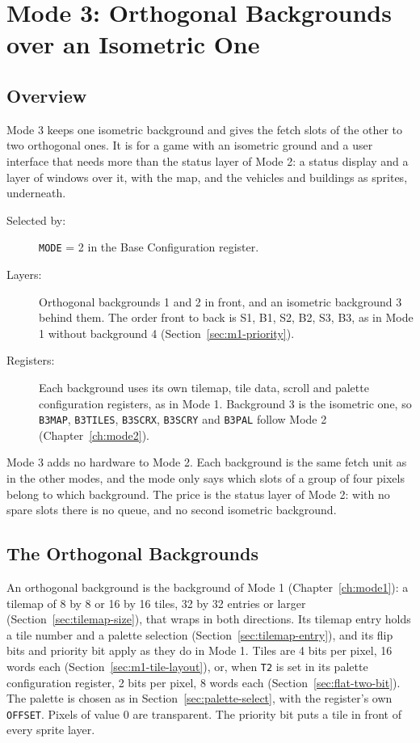 \chapter{Mode 3: Orthogonal Backgrounds over an Isometric One}
\label{ch:mode3}

\section{Overview}

Mode 3 keeps one isometric background and gives the fetch slots of the other to two orthogonal ones. It is for a game
with an isometric ground and a user interface that needs more than the status layer of Mode 2: a status display and a
layer of windows over it, with the map, and the vehicles and buildings as sprites, underneath.

\begin{description}
	\item[Selected by:] \texttt{MODE} = 2 in the Base Configuration register.
	\item[Layers:] Orthogonal backgrounds 1 and 2 in front, and an isometric background 3 behind them. The order front to back is
	      S1, B1, S2, B2, S3, B3, as in Mode 1 without background 4 (Section~\ref{sec:m1-priority}).
	\item[Registers:] Each background uses its own tilemap, tile data, scroll and palette configuration registers, as in Mode 1.
	      Background 3 is the isometric one, so \texttt{B3MAP}, \texttt{B3TILES}, \texttt{B3SCRX}, \texttt{B3SCRY} and
	      \texttt{B3PAL} follow Mode 2 (Chapter~\ref{ch:mode2}).
\end{description}

Mode 3 adds no hardware to Mode 2. Each background is the same fetch unit as in the other modes, and the mode only says
which slots of a group of four pixels belong to which background. The price is the status layer of Mode 2: with no
spare slots there is no queue, and no second isometric background.

\section{The Orthogonal Backgrounds}

An orthogonal background is the background of Mode 1 (Chapter~\ref{ch:mode1}): a tilemap of 8 by 8 or 16 by 16 tiles,
32 by 32 entries or larger (Section~\ref{sec:tilemap-size}), that wraps in both directions. Its tilemap entry holds a
tile number and a palette selection (Section~\ref{sec:tilemap-entry}), and its flip bits and priority bit apply as they
do in Mode 1. Tiles are 4 bits per pixel, 16 words each (Section~\ref{sec:m1-tile-layout}), or, when \texttt{T2} is set
in its palette configuration register, 2 bits per pixel, 8 words each (Section~\ref{sec:flat-two-bit}). The palette is
chosen as in Section~\ref{sec:palette-select}, with the register's own \texttt{OFFSET}. Pixels of value 0 are
transparent. The priority bit puts a tile in front of every sprite layer.

